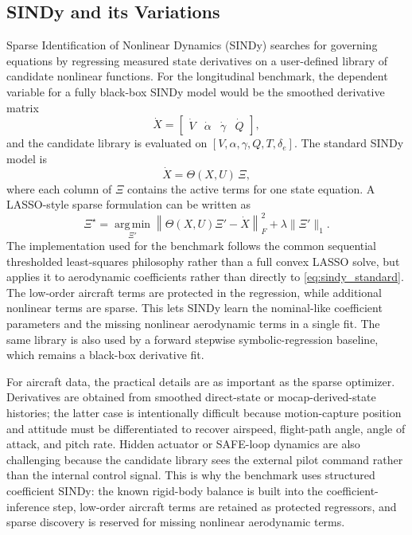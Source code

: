 \documentclass[11pt]{article}
\begin{document}
\subsection{SINDy and its Variations}
Sparse Identification of Nonlinear Dynamics (SINDy) searches for governing
equations by regressing measured state derivatives on a user-defined library of
candidate nonlinear functions. For the longitudinal benchmark, the dependent
variable for a fully black-box SINDy model would be the smoothed derivative matrix
\[
    \dot{X} =
    \begin{bmatrix}
    \dot{V} & \dot{\alpha} & \dot{\gamma} & \dot{Q}
    \end{bmatrix},
\]
and the candidate library is evaluated on
$[V,\alpha,\gamma,Q,T,\delta_e]$. The standard SINDy model is
\begin{equation}
    \dot{X} = \Theta(X,U)\,\Xi,
    \label{eq:sindy_standard}
\end{equation}
where each column of $\Xi$ contains the active terms for one state equation. A
LASSO-style sparse formulation can be written as
\begin{equation}
    \Xi^\star
    =
    \operatorname*{arg\,min}_{\Xi'}
    \left\|
    \Theta(X,U)\Xi' - \dot{X}
    \right\|_F^2
    +\lambda\|\Xi'\|_1 .
    \label{eq:sindy_lasso}
\end{equation}
The implementation used for the benchmark follows the common sequential
thresholded least-squares philosophy rather than a full convex LASSO solve, but
applies it to aerodynamic coefficients rather than directly to
\eqref{eq:sindy_standard}. The low-order aircraft terms are protected in the
regression, while additional nonlinear terms are sparse. This lets SINDy learn
the nominal-like coefficient parameters and the missing nonlinear aerodynamic
terms in a single fit. The same library is also used by a forward stepwise
symbolic-regression baseline, which remains a black-box derivative fit.

For aircraft data, the practical details are as important as the sparse
optimizer. Derivatives are obtained from smoothed direct-state or
mocap-derived-state histories; the latter case is intentionally difficult
because motion-capture position and attitude must be differentiated to recover
airspeed, flight-path angle, angle of attack, and pitch rate. Hidden actuator
or SAFE-loop dynamics are also challenging because the candidate library sees
the external pilot command rather than the internal control signal. This is why
the benchmark uses structured coefficient SINDy: the known rigid-body balance is
built into the coefficient-inference step, low-order aircraft terms are retained
as protected regressors, and sparse discovery is reserved for missing nonlinear
aerodynamic terms.
\end{document}
